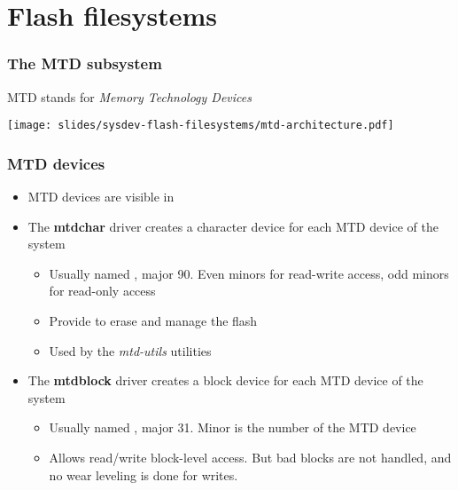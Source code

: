 \section{Flash filesystems}

\begin{frame}
  \frametitle{The MTD subsystem}
  MTD stands for {\em Memory Technology Devices}
  \begin{center}
    \texttt{[image: slides/sysdev-flash-filesystems/mtd-architecture.pdf]}
  \end{center}
\end{frame}

\begin{frame}
  \frametitle{MTD devices}
  \begin{itemize}
  \item MTD devices are visible in 
  \item The {\bf mtdchar} driver creates a character device for each
    MTD device of the system
    \begin{itemize}
    \item Usually named , major 90. Even minors for
      read-write access, odd minors for read-only access
    \item Provide  to erase and manage the flash
    \item Used by the {\em mtd-utils} utilities
    \end{itemize}
  \item The {\bf mtdblock} driver creates a block device for each MTD
    device of the system
    \begin{itemize}
    \item Usually named , major 31. Minor is the
      number of the MTD device
    \item Allows read/write block-level access. But bad blocks are not
      handled, and no wear leveling is done for writes.
    \end{itemize}
  \end{itemize}
\end{frame}

